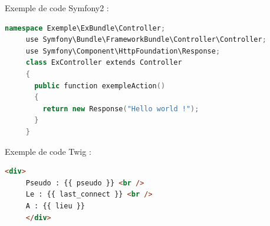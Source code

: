 \begin{frame}[fragile]
  Exemple de code Symfony2 :
  \begin{lstlisting}[language=c++]
     namespace Exemple\ExBundle\Controller;
     use Symfony\Bundle\FrameworkBundle\Controller\Controller;
     use Symfony\Component\HttpFoundation\Response;
     class ExController extends Controller
     {
       public function exempleAction()
       {
         return new Response("Hello world !");
       }
     }
  \end{lstlisting}
\end{frame}

\begin{frame}[fragile]
  Exemple de code Twig :
  \begin{lstlisting}[language=html]
     <div>
     Pseudo : {{ pseudo }} <br />
     Le : {{ last_connect }} <br />
     A : {{ lieu }}
     </div>
  \end{lstlisting}
\end{frame}
